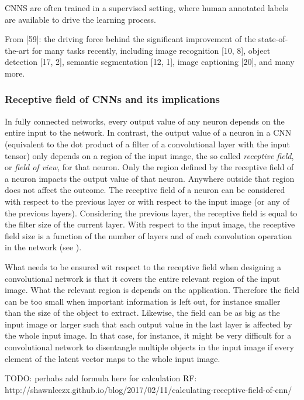 \documentclass[12pt,a4paper]{article}
\begin{document}
\par CNNS are often trained in a supervised setting, where human annotated labels are available to drive the learning process.

\par From [59]: the driving force behind the significant improvement of the state-of-the-art for many tasks recently, including image recognition [10, 8], object detection [17, 2], semantic segmentation [12, 1], image
captioning [20], and many more.


\subsubsection{Receptive field of CNNs and its implications}
In fully connected networks, every output value of any neuron depends on the entire input to the network. In contrast, the output value of a neuron in a CNN (equivalent to the dot product of a filter of a convolutional layer with the input tensor) only depends on a region of the input image, the so called \textit{receptive field}, or \textit{field of view}, for that neuron. Only the region defined by the receptive field of a neuron impacts the output value of that neuron. Anywhere outside that region does not affect the outcome. The receptive field of a neuron can be considered with respect to the previous layer or with respect to the input image (or any of the previous layers). Considering the previous layer, the receptive field is equal to the filter size of the current layer. With respect to the input image, the receptive field size is a function of the number of layers and of each convolution operation in the network (see \cite{hien_recept_field_2017}).

What needs to be ensured wit respect to the receptive field when designing a convolutional network is that it covers the entire relevant region of the input image. What the relevant region is depends on the application. Therefore the field can be too small when important information is left out, for instance smaller than the size of the object to extract. Likewise, the field can be as big as the input image or larger such that each output value in the last layer is affected by the whole input image. In that case, for instance, it might be very difficult for a convolutional network to disentangle multiple objects in the input image if every element of the latent vector maps to the whole input image.

TODO: perhabs add formula here for calculation RF: http://shawnleezx.github.io/blog/2017/02/11/calculating-receptive-field-of-cnn/
\end{document}
